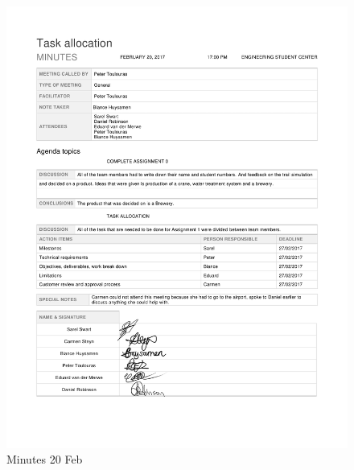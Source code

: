 \begin{appendices}
\begin{figure}[H]
\centering
\includegraphics[scale=0.25]{Meeting_minutes_20_Feb.png}
\caption{Minutes 20 Feb}
\end{figure}


\end{appendices}
